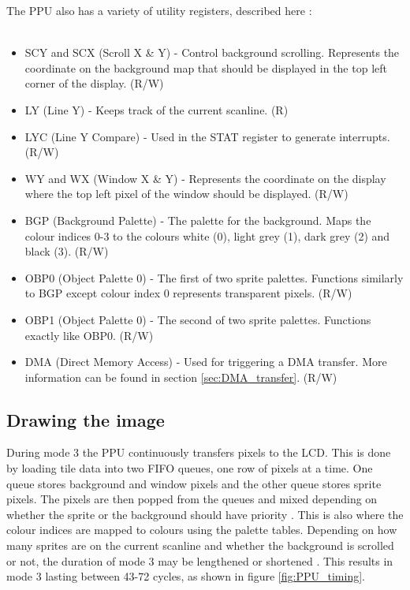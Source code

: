 \vspace{30pt}

The PPU also has a variety of utility registers, described here \cite{pandocsVideo}:\\
\\
\begin{itemize}
    \item SCY and SCX (Scroll X \& Y) - Control background scrolling. Represents the coordinate on the background map that should be displayed in the top left corner of the display. (R/W)
    \item LY (Line Y) - Keeps track of the current scanline. (R)
    \item LYC (Line Y Compare) - Used in the STAT register to generate interrupts. (R/W)
    \item WY and WX (Window X \& Y) - Represents the coordinate on the display where the top left pixel of the window should be displayed. (R/W)
    \item BGP (Background Palette) - The palette for the background. Maps the colour indices 0-3 to the colours white (0), light grey (1), dark grey (2) and black (3). (R/W)
    \item OBP0 (Object Palette 0) - The first of two sprite palettes. Functions similarly to BGP except colour index 0 represents transparent pixels. (R/W)
    \item OBP1 (Object Palette 0) - The second of two sprite palettes. Functions exactly like OBP0. (R/W)
    \item DMA (Direct Memory Access) - Used for triggering a DMA transfer. More information can be found in section \ref{sec:DMA_transfer}.  (R/W)
\end{itemize}

\subsection{Drawing the image}
\label{sec:PPU_Drawing}
During mode 3 the PPU continuously transfers pixels to the LCD. This is done by loading tile data into two FIFO queues, one row of pixels at a time. One queue stores background  and window pixels and the other queue stores sprite pixels. The pixels are then popped from the queues and mixed depending on whether the sprite or the background should have priority \cite{pandocsDrawing}. This is also where the colour indices are mapped to colours using the palette tables. Depending on how many sprites are on the current scanline and whether the background is scrolled or not, the duration of mode 3 may be lengthened or shortened \cite{pandocsDrawing}. This results in mode 3 lasting between 43-72 cycles, as shown in figure \ref{fig:PPU_timing}.

